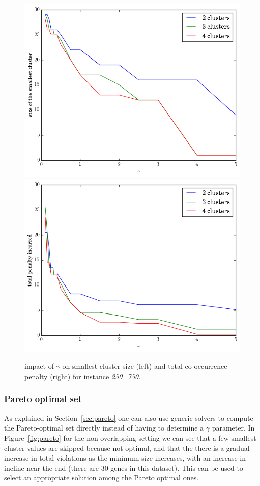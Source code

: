 \documentclass[conference]{IEEEtran}
\begin{document}
\begin{figure}
\centering
\includegraphics[scale=0.25]{images/gamma_smallest_cluster_size}
\includegraphics[scale=0.25]{images/gamma_total_penalty_incurred}
\captionsetup{font=small}
\caption{impact of $\gamma$ on smallest cluster size (left) and total co-occurrence penalty (right) for instance \emph{250\_750}.}
\label{fig:gamma}
\end{figure}

\subsubsection{Pareto optimal set}
As explained in Section~\ref{sec:pareto} one can also use generic solvers to compute the Pareto-optimal set directly instead of having to determine a $\gamma$ parameter. In Figure~\ref{fig:pareto} for the non-overlapping setting we can see that a few smallest cluster values are skipped because not optimal, and that the there is a gradual increase in total violations as the minimum size increases, with an increase in incline near the end (there are 30 genes in this dataset). This can be used to select an appropriate solution among the Pareto optimal ones.
\end{document}
